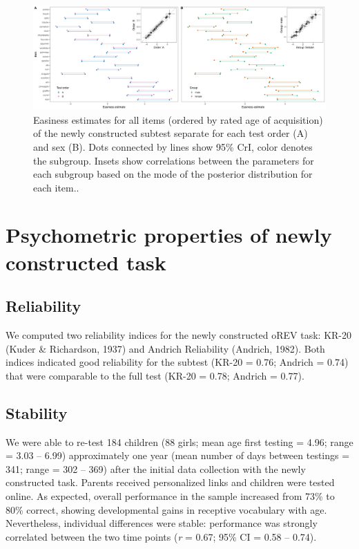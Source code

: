 \documentclass[
  man,floatsintext]{apa6}
\begin{document}
\begin{figure}

{\centering \includegraphics[width=1\linewidth]{../graphs/item_fig4} 

}

\caption{Easiness estimates for all items (ordered by rated age of acquisition) of the newly constructed subtest separate for each test order (A) and sex (B). Dots connected by lines show 95\% CrI, color denotes the subgroup. Insets show correlations between the parameters for each subgroup based on the mode of the posterior distribution for each item..}\label{fig:fig4}
\end{figure}

\hypertarget{psychometric-properties-of-newly-constructed-task}{%
\section{Psychometric properties of newly constructed task}\label{psychometric-properties-of-newly-constructed-task}}

\hypertarget{reliability}{%
\subsection{Reliability}\label{reliability}}

We computed two reliability indices for the newly constructed oREV task: KR-20 (Kuder \& Richardson, 1937) and Andrich Reliability (Andrich, 1982). Both indices indicated good reliability for the subtest (KR-20 = 0.76; Andrich = 0.74) that were comparable to the full test (KR-20 = 0.78; Andrich = 0.77).

\hypertarget{stability}{%
\subsection{Stability}\label{stability}}

We were able to re-test 184 children (88 girls; mean age first testing = 4.96; range = 3.03 -- 6.99) approximately one year (mean number of days between testings = 341; range = 302 -- 369) after the initial data collection with the newly constructed task. Parents received personalized links and children were tested online. As expected, overall performance in the sample increased from 73\% to 80\% correct, showing developmental gains in receptive vocabulary with age. Nevertheless, individual differences were stable: performance was strongly correlated between the two time points (\emph{r} = 0.67; 95\% CI = 0.58 -- 0.74).
\end{document}
